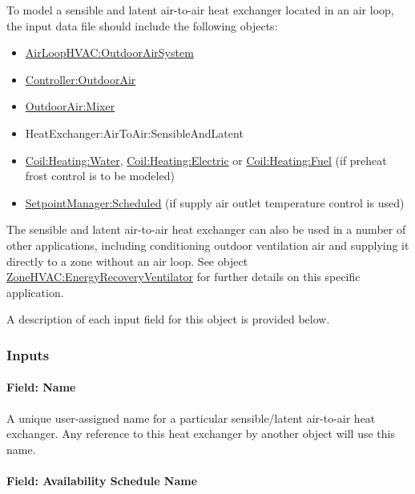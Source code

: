 To model a sensible and latent air-to-air heat exchanger located in an air loop, the input data file should include the following objects:

\begin{itemize}
\item
  \hyperref[airloophvacoutdoorairsystem]{AirLoopHVAC:OutdoorAirSystem}
\item
  \hyperref[controlleroutdoorair]{Controller:OutdoorAir}
\item
  \hyperref[outdoorairmixer]{OutdoorAir:Mixer}
\item
  HeatExchanger:AirToAir:SensibleAndLatent
\item
  \hyperref[coilheatingwater]{Coil:Heating:Water}, \hyperref[coilheatingelectric]{Coil:Heating:Electric} or \hyperref[coilheatinggas-000]{Coil:Heating:Fuel} (if preheat frost control is to be modeled)
\item
  \hyperref[setpointmanagerscheduled]{SetpointManager:Scheduled} (if supply air outlet temperature control is used)
\end{itemize}

The sensible and latent air-to-air heat exchanger can also be used in a number of other applications, including conditioning outdoor ventilation air and supplying it directly to a zone without an air loop. See object \hyperref[zonehvacenergyrecoveryventilator]{ZoneHVAC:EnergyRecoveryVentilator} for further details on this specific application.

A description of each input field for this object is provided below.

\subsubsection{Inputs}\label{inputs-1-019}

\paragraph{Field: Name}\label{field-name-1-018}

A unique user-assigned name for a particular sensible/latent air-to-air heat exchanger. Any reference to this heat exchanger by another object will use this name.

\paragraph{Field: Availability Schedule Name}\label{field-availability-schedule-name-1-006}

